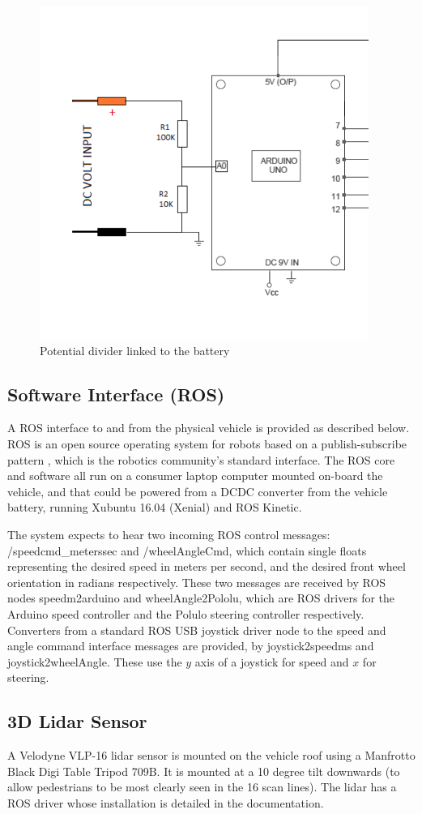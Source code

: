 \documentclass[a4paper]{article}
\begin{document}
	\begin{figure}
		\centering
		\includegraphics[width=0.5\columnwidth]{hardware/potential_divider.png}
		\caption{Potential divider linked to the battery}
		\label{fig:potential_divider}
	\end{figure}
	
	\subsection{Software Interface (ROS)}
	
	A ROS interface to and from the physical vehicle is provided as described below. ROS is an open source operating system for robots based on a publish-subscribe pattern \cite{quigley2009ros}, which is the robotics community’s standard interface. The ROS core and software all run on a consumer laptop computer mounted on-board the vehicle, and that could be powered from a DCDC converter from the vehicle battery, running Xubuntu 16.04 (Xenial) and ROS Kinetic. 
	
	The system expects to hear two incoming ROS control messages: /speedcmd\_meterssec and /wheelAngleCmd, which contain single floats representing the desired speed in meters per second, and the desired front wheel orientation in radians respectively. These two messages are received by ROS nodes speedm2arduino and wheelAngle2Pololu, which are ROS drivers for the Arduino speed controller and the Polulo steering controller respectively. Converters from a standard ROS USB joystick driver node to the speed and angle command interface messages are provided, by joystick2speedms and joystick2wheelAngle. These use the $y$ axis of a joystick for speed and $x$ for steering.
	
	\subsection{3D Lidar Sensor}
	A Velodyne VLP-16 lidar sensor is mounted on the vehicle roof using a Manfrotto Black Digi Table Tripod 709B. It is mounted at a 10 degree tilt downwards (to allow pedestrians to be most clearly seen in the 16 scan lines). The lidar has a ROS driver whose installation is detailed in the documentation. 
	
\end{document}
